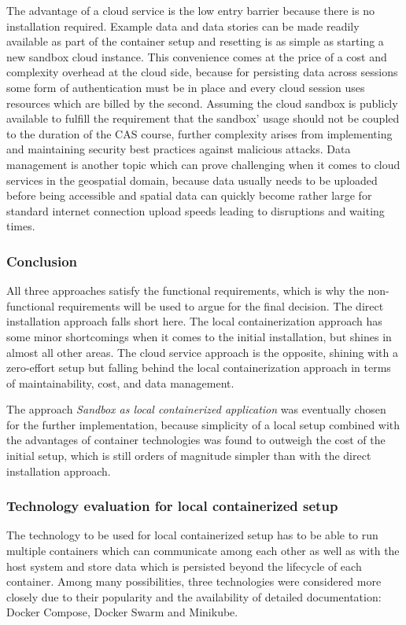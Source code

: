 \documentclass[11pt, a4paper, oneside, parskip=full-]{scrartcl}
\begin{document}
The advantage of a cloud service is the low entry barrier because there is no
installation required. Example data and data stories can be made readily
available as part of the container setup and resetting is as simple as starting
a new sandbox cloud instance. This convenience comes at the price of a cost and
complexity overhead at the cloud side, because for persisting data across
sessions some form of authentication must be in place and every cloud session
uses resources which are billed by the second. Assuming the cloud sandbox is
publicly available to fulfill the requirement that the sandbox' usage should not
be coupled to the duration of the CAS course, further complexity arises from
implementing and maintaining security best practices against malicious attacks.
Data management is another topic which can prove challenging when it comes to
cloud services in the geospatial domain, because data usually needs to be
uploaded before being accessible and spatial data can quickly become rather
large for standard internet connection upload speeds leading to disruptions and
waiting times.

\subsubsection*{Conclusion}
All three approaches satisfy the functional requirements, which is why the
non-functional requirements will be used to argue for the final decision. The
direct installation approach falls short here. The local containerization
approach has some minor shortcomings when it comes to the initial installation,
but shines in almost all other areas. The cloud service approach is the
opposite, shining with a zero-effort setup but falling behind the local
containerization approach in terms of maintainability, cost, and data
management.

The approach \emph{Sandbox as local containerized application} was eventually
chosen for the further implementation, because simplicity of a local setup
combined with the advantages of container technologies was found to outweigh the
cost of the initial setup, which is still orders of magnitude simpler than with
the direct installation approach.

\subsubsection{Technology evaluation for local containerized setup}
The technology to be used for local containerized setup has to be able to run
multiple containers which can communicate among each other as well as with the
host system and store data which is persisted beyond the lifecycle of each
container. Among many possibilities, three technologies were considered more
closely due to their popularity and the availability of detailed documentation:
Docker Compose, Docker Swarm and Minikube.
\end{document}

